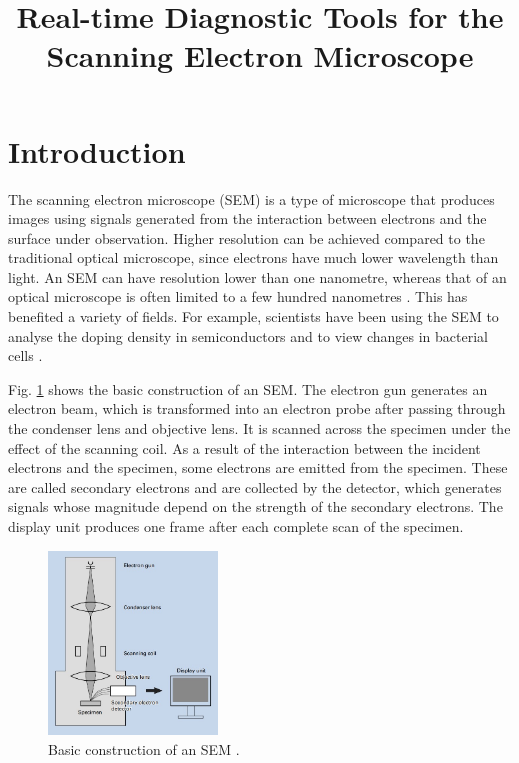 \documentclass[conference]{IEEEtran}
\begin{document}
\title{Real-time Diagnostic Tools for the Scanning Electron Microscope}
\author{
}
\maketitle

\begin{abstract}
\end{abstract}

\section{Introduction}
The scanning electron microscope (SEM) is a type of microscope that produces images using signals generated from the interaction between electrons and the surface under observation. Higher resolution can be achieved compared to the traditional optical microscope, since electrons have much lower wavelength than light. An SEM can have resolution lower than one nanometre, whereas that of an optical microscope is often limited to a few hundred nanometres \cite{SEM wiki}. This has benefited a variety of fields. For example, scientists have been using the SEM to analyse the doping density in semiconductors \cite{SEM for semiconductor} and to view changes in bacterial cells \cite{SEM for bacterial cells}.

Fig. \ref{SEM basic construction} shows the basic construction of an SEM. The electron gun generates an electron beam, which is transformed into an electron probe after passing through the condenser lens and objective lens. It is scanned across the specimen under the effect of the scanning coil. As a result of the interaction between the incident electrons and the specimen, some electrons are emitted from the specimen. These are called secondary electrons and are collected by the detector, which generates signals whose magnitude depend on the strength of the secondary electrons. The display unit produces one frame after each complete scan of the specimen.

\begin{figure}[htbp]
    \centering
    \includegraphics[width=0.4\textwidth]{Images/SEM basic construction.jpg}
    \caption{Basic construction of an SEM \cite{SEM A to Z}.}
    \label{SEM basic construction}
\end{figure}
\end{document}
